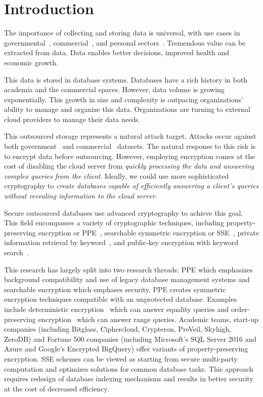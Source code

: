 
\section{Introduction}

The importance of collecting and storing data is universal, with use cases in governmental~\cite{Powers2014}, commercial~\cite{Linoff:2002:MWT:560274,insightdata}, and personal sectors~\cite{Mons2011}.  Tremendous value can be extracted from data.  Data enables better decisions, improved health and economic growth.

This data is stored in database systems.  Databases have a rich history in both academia and the commercial spaces.  However, data volume is growing exponentially.  This growth in size and complexity is outpacing organizations' ability to manage and
organize this data.  Organizations are turning to external cloud providers
to manage their data needs.  

This outsourced storage represents a natural attack target.  Attacks occur against both government~\cite{CyberAttacksOPM} and commercial~\cite{CyberAttacks,gressin2017equifax} datasets.
The natural response to this risk is to encrypt data before outsourcing. 
%
However, employing encryption comes at the cost of disabling the cloud server
from {\em quickly processing the data and answering
complex queries from the client}. 
%
Ideally, we could use more sophisticated cryptography to {\em create databases
capable of efficiently answering a client's queries without revealing
information to the cloud server}.  


Secure outsourced databases use advanced cryptography to achieve this goal.  This field encompasses a variety of cryptographic techniques, including property-preserving encryption or PPE~\cite{EC:PanRou12}, searchable symmetric encryption or SSE~\cite{CCS:CGKO06}, private information retrieval by keyword~\cite{EPRINT:ChoGilNao98}, and public-key encryption with keyword search~\cite{EC:BDOP04}.  

This research has largely split into two research threads: PPE which emphasizes background compatibility and use of legacy database management systems and searchable encryption which emphases security.  PPE creates symmetric encryption techniques
compatible with an unprotected database. Examples include deterministic
encryption~\cite{C:BelBolONe07} which can answer equality queries and order-preserving encryption~\cite{C:BolCheONe11,EC:BCLO09}
which can answer range queries. Academic teams, start-up companies (including Bitglass, Ciphercloud, Crypteron, PreVeil, Skyhigh, ZeroDB) and Fortune
500 companies (including Microsoft's SQL Server 2016 and Azure and Google's Encrypted BigQuery)  offer variants of property-preserving encryption.
%
SSE schemes can be viewed as starting from secure multi-party computation and
optimizes solutions for common database tasks. This approach requires redesign
of database indexing mechanisms and results in better security at the cost of
decreased efficiency. 

